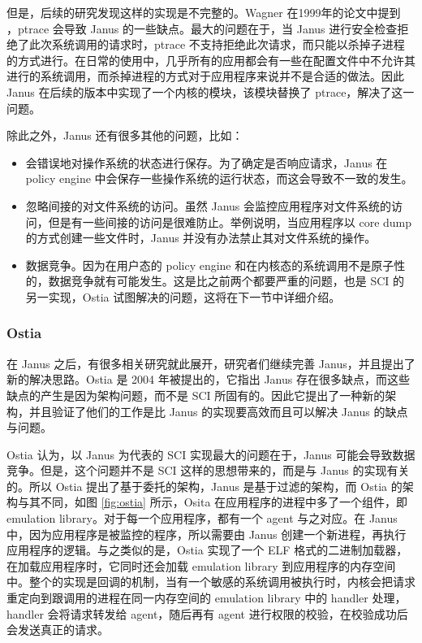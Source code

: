 \documentclass[final,12pt]{elsarticle}
\begin{document}
但是，后续的研究发现这样的实现是不完整的。Wagner 在1999年的论文中提到 \cite{wagner1999janus}，ptrace 会导致 Janus 的一些缺点。最大的问题在于，当 Janus 进行安全检查拒绝了此次系统调用的请求时，ptrace 不支持拒绝此次请求，而只能以杀掉子进程的方式进行。在日常的使用中，几乎所有的应用都会有一些在配置文件中不允许其进行的系统调用，而杀掉进程的方式对于应用程序来说并不是合适的做法。因此 Janus 在后续的版本中实现了一个内核的模块，该模块替换了 ptrace，解决了这一问题。

除此之外，Janus 还有很多其他的问题，比如：

\begin{itemize}
\item
会错误地对操作系统的状态进行保存。为了确定是否响应请求，Janus 在 policy engine 中会保存一些操作系统的运行状态，而这会导致不一致的发生。
\item
忽略间接的对文件系统的访问。虽然 Janus 会监控应用程序对文件系统的访问，但是有一些间接的访问是很难防止。举例说明，当应用程序以 core dump 的方式创建一些文件时，Janus 并没有办法禁止其对文件系统的操作。
\item
数据竞争。因为在用户态的 policy engine 和在内核态的系统调用不是原子性的，数据竞争就有可能发生。这是比之前两个都要严重的问题，也是 SCI 的另一实现，Ostia 试图解决的问题\cite{garfinkel2003traps}，这将在下一节中详细介绍。
\end{itemize}

\subsubsection{Ostia} 
\label{sss:ostia}

在 Janus 之后，有很多相关研究就此展开，研究者们继续完善 Janus，并且提出了新的解决思路。Ostia \cite{garfinkel} 是 2004 年被提出的，它指出 Janus 存在很多缺点，而这些缺点的产生是因为架构问题，而不是 SCI 所固有的。因此它提出了一种新的架构，并且验证了他们的工作是比 Janus 的实现要高效而且可以解决 Janus 的缺点与问题。

Ostia 认为，以  Janus 为代表的 SCI 实现最大的问题在于，Janus 可能会导致数据竞争。但是，这个问题并不是 SCI 这样的思想带来的，而是与 Janus 的实现有关的。所以 Ostia 提出了基于委托的架构，Janus 是基于过滤的架构，而 Ostia 的架构与其不同，如图 \ref{fig:ostia} 所示，Osita 在应用程序的进程中多了一个组件，即 emulation library。对于每一个应用程序，都有一个 agent 与之对应。在 Janus 中，因为应用程序是被监控的程序，所以需要由 Janus 创建一个新进程，再执行应用程序的逻辑。与之类似的是，Ostia 实现了一个 ELF 格式的二进制加载器，在加载应用程序时，它同时还会加载 emulation library 到应用程序的内存空间中。整个的实现是回调的机制，当有一个敏感的系统调用被执行时，内核会把请求重定向到跟调用的进程在同一内存空间的 emulation library 中的 handler 处理，handler 会将请求转发给 agent，随后再有 agent 进行权限的校验，在校验成功后会发送真正的请求。
\end{document}
